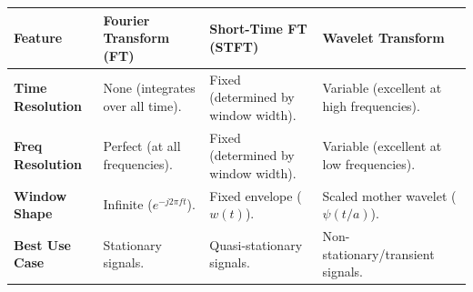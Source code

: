 \documentclass[12pt,a4paper]{article}
\renewcommand{\arraystretch}{1.45}
\begin{document}
\begin{tcolorbox}[tikzbox, title={\textbf{Time-Frequency Analysis Features}}]
\par\noindent
{\renewcommand{\arraystretch}{1.4}%
\begin{tabularx}{\linewidth}{|B{3.2cm}|Y|Y|Y|}
\hline
\textbf{Feature} & \textbf{Fourier Transform (FT)} & \textbf{Short-Time FT (STFT)} & \textbf{Wavelet Transform} \\
\hline
\textbf{Time Resolution} & None (integrates over all time). & Fixed (determined by window width). & Variable (excellent at high frequencies). \\
\hline
\textbf{Freq Resolution} & Perfect (at all frequencies). & Fixed (determined by window width). & Variable (excellent at low frequencies). \\
\hline
\textbf{Window Shape} & Infinite ($e^{-j 2\pi f t}$). & Fixed envelope ($w(t)$). & Scaled mother wavelet ($\psi(t/a)$). \\
\hline
\textbf{Best Use Case} & Stationary signals. & Quasi-stationary signals. & Non-stationary/transient signals. \\
\hline
\end{tabularx}}
\end{tcolorbox}
\end{document}
